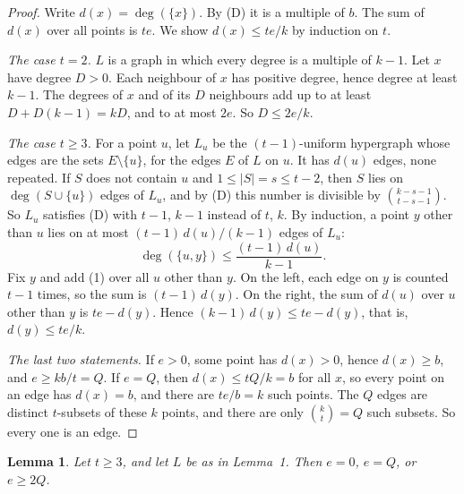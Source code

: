 \documentclass[11pt,a4paper]{article}
\newtheorem{lemma}{Lemma}
\newcommand{\abs}[1]{\lvert #1\rvert}
\begin{document}
\begin{proof}
Write $d(x)=\deg(\{x\})$. By (D) it is a multiple of $b$. The sum of $d(x)$
over all points is $te$. We show $d(x)\le te/k$ by induction on $t$.

\emph{The case $t=2$.} $L$ is a graph in which every degree is a multiple of
$k-1$. Let $x$ have degree $D>0$. Each neighbour of $x$ has positive degree,
hence degree at least $k-1$. The degrees of $x$ and of its $D$ neighbours add
up to at least $D+D(k-1)=kD$, and to at most $2e$. So $D\le 2e/k$.

\emph{The case $t\ge 3$.} For a point $u$, let $L_u$ be the $(t-1)$-uniform
hypergraph whose edges are the sets $E\setminus\{u\}$, for the edges $E$ of
$L$ on $u$. It has $d(u)$ edges, none repeated. If $S$ does not contain $u$
and $1\le\abs{S}=s\le t-2$, then $S$ lies on $\deg(S\cup\{u\})$ edges of
$L_u$, and by (D) this number is divisible by $\binom{k-s-1}{t-s-1}$. So
$L_u$ satisfies (D) with $t-1$, $k-1$ instead of $t$, $k$. By induction, a
point $y$ other than $u$ lies on at most $(t-1)\,d(u)/(k-1)$ edges of $L_u$:
\begin{equation}
\deg(\{u,y\})\le \frac{(t-1)\,d(u)}{k-1}. \tag{1}
\end{equation}
Fix $y$ and add (1) over all $u$ other than $y$. On the left, each edge on
$y$ is counted $t-1$ times, so the sum is $(t-1)\,d(y)$. On the right, the
sum of $d(u)$ over $u$ other than $y$ is $te-d(y)$. Hence
$(k-1)\,d(y)\le te-d(y)$, that is, $d(y)\le te/k$.

\emph{The last two statements.} If $e>0$, some point has $d(x)>0$, hence
$d(x)\ge b$, and $e\ge kb/t=Q$. If $e=Q$, then $d(x)\le tQ/k=b$ for all $x$,
so every point on an edge has $d(x)=b$, and there are $te/b=k$ such points.
The $Q$ edges are distinct $t$-subsets of these $k$ points, and there are
only $\binom{k}{t}=Q$ such subsets. So every one is an edge.
\end{proof}

\begin{lemma}
Let $t\ge 3$, and let $L$ be as in Lemma~1. Then $e=0$, $e=Q$, or $e\ge 2Q$.
\end{lemma}
\end{document}
